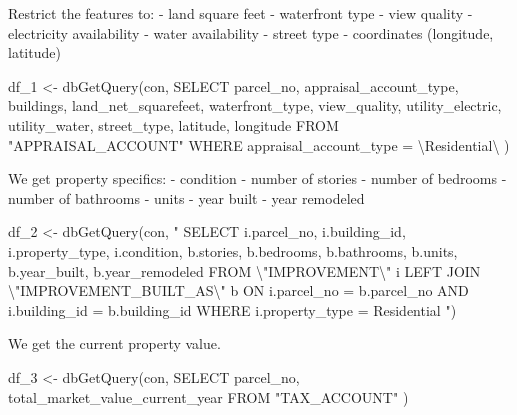 \documentclass[
  english,
  letterpaper,
  DIV=11,
  numbers=noendperiod]{scrreprt}
\newenvironment{Shaded}{\begin{snugshade}}{\end{snugshade}}
\newcommand{\FunctionTok}[1]{\textcolor[rgb]{0.28,0.35,0.67}{#1}}
\newcommand{\NormalTok}[1]{\textcolor[rgb]{0.00,0.23,0.31}{#1}}
\newcommand{\OtherTok}[1]{\textcolor[rgb]{0.00,0.23,0.31}{#1}}
\newcommand{\SpecialCharTok}[1]{\textcolor[rgb]{0.37,0.37,0.37}{#1}}
\newcommand{\StringTok}[1]{\textcolor[rgb]{0.13,0.47,0.30}{#1}}
\begin{document}
Restrict the features to: - land square feet - waterfront type - view
quality - electricity availability - water availability - street type -
coordinates (longitude, latitude)

\begin{Shaded}
\begin{Highlighting}[]
\NormalTok{df\_1 }\OtherTok{\textless{}{-}} \FunctionTok{dbGetQuery}\NormalTok{(con, }\StringTok{\textquotesingle{}}
\StringTok{  SELECT parcel\_no, appraisal\_account\_type, buildings, land\_net\_squarefeet, waterfront\_type, view\_quality,}
\StringTok{  utility\_electric, utility\_water, street\_type, latitude, longitude}
\StringTok{  FROM "APPRAISAL\_ACCOUNT"}
\StringTok{  WHERE appraisal\_account\_type = }\SpecialCharTok{\textbackslash{}\textquotesingle{}}\StringTok{Residential}\SpecialCharTok{\textbackslash{}\textquotesingle{}}
\StringTok{\textquotesingle{}}\NormalTok{)}
\end{Highlighting}
\end{Shaded}

We get property specifics: - condition - number of stories - number of
bedrooms - number of bathrooms - units - year built - year remodeled

\begin{Shaded}
\begin{Highlighting}[]
\NormalTok{df\_2 }\OtherTok{\textless{}{-}} \FunctionTok{dbGetQuery}\NormalTok{(con, }\StringTok{"}
\StringTok{  SELECT i.parcel\_no, i.building\_id, i.property\_type, i.condition,}
\StringTok{         b.stories, b.bedrooms, b.bathrooms, b.units, b.year\_built, b.year\_remodeled}
\StringTok{  FROM }\SpecialCharTok{\textbackslash{}"}\StringTok{IMPROVEMENT}\SpecialCharTok{\textbackslash{}"}\StringTok{ i}
\StringTok{  LEFT JOIN }\SpecialCharTok{\textbackslash{}"}\StringTok{IMPROVEMENT\_BUILT\_AS}\SpecialCharTok{\textbackslash{}"}\StringTok{ b }
\StringTok{    ON i.parcel\_no = b.parcel\_no }
\StringTok{    AND i.building\_id = b.building\_id}
\StringTok{  WHERE i.property\_type = \textquotesingle{}Residential\textquotesingle{}}
\StringTok{"}\NormalTok{)}
\end{Highlighting}
\end{Shaded}

We get the current property value.

\begin{Shaded}
\begin{Highlighting}[]
\NormalTok{df\_3 }\OtherTok{\textless{}{-}} \FunctionTok{dbGetQuery}\NormalTok{(con, }\StringTok{\textquotesingle{}}
\StringTok{  SELECT parcel\_no, total\_market\_value\_current\_year}
\StringTok{  FROM "TAX\_ACCOUNT"}
\StringTok{\textquotesingle{}}\NormalTok{)}
\end{Highlighting}
\end{Shaded}
\end{document}
